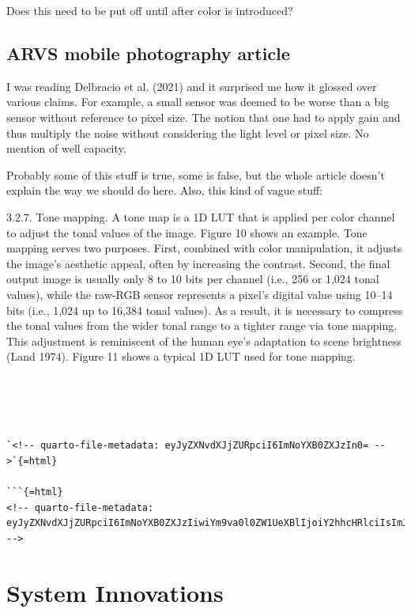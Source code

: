 \documentclass[
  letterpaper,
]{book}
\begin{document}
Does this need to be put off until after color is introduced?

\section{ARVS mobile photography
article}\label{arvs-mobile-photography-article}

I was reading Delbracio et al. (2021) and it surprised me how it glossed
over various claims. For example, a small sensor was deemed to be worse
than a big sensor without reference to pixel size. The notion that one
had to apply gain and thus multiply the noise without considering the
light level or pixel size. No mention of well capacity.

Probably some of this stuff is true, some is false, but the whole
article doesn't explain the way we should do here. Also, this kind of
vague stuff:

3.2.7. Tone mapping. A tone map is a 1D LUT that is applied per color
channel to adjust the tonal values of the image. Figure 10 shows an
example. Tone mapping serves two purposes. First, combined with color
manipulation, it adjusts the image's aesthetic appeal, often by
increasing the contrast. Second, the final output image is usually only
8 to 10 bits per channel (i.e., 256 or 1,024 tonal values), while the
raw-RGB sensor represents a pixel's digital value using 10--14 bits
(i.e., 1,024 up to 16,384 tonal values). As a result, it is necessary to
compress the tonal values from the wider tonal range to a tighter range
via tone mapping. This adjustment is reminiscent of the human eye's
adaptation to scene brightness (Land 1974). Figure 11 shows a typical 1D
LUT used for tone mapping.

\begin{verbatim}




`<!-- quarto-file-metadata: eyJyZXNvdXJjZURpciI6ImNoYXB0ZXJzIn0= -->`{=html}

```{=html}
<!-- quarto-file-metadata: eyJyZXNvdXJjZURpciI6ImNoYXB0ZXJzIiwiYm9va0l0ZW1UeXBlIjoiY2hhcHRlciIsImJvb2tJdGVtTnVtYmVyIjoxOSwiYm9va0l0ZW1GaWxlIjoiY2hhcHRlcnMvc2Vuc29ycy0wNy1pbm5vdmF0aW9ucy5xbWQiLCJib29rSXRlbURlcHRoIjoxfQ== -->
\end{verbatim}

\chapter{System Innovations}\label{sec-sensor-innovations}
\end{document}
